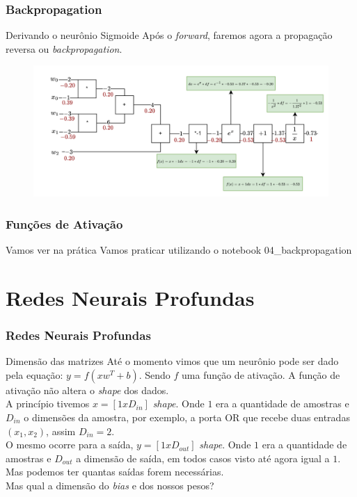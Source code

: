 \documentclass{beamer}
\begin{document}
\begin{frame}
	\frametitle{Backpropagation}
	\begin{block}{Derivando o neurônio Sigmoide}
		Após o \textit{forward}, faremos agora a propagação reversa ou \textit{backpropagation}.
		\begin{figure}
			\centering
			\includegraphics[width=1\linewidth]{figures/sigmoid_example_backprop}
		\end{figure}
	\end{block}
\end{frame}
\begin{frame}
	\frametitle{Funções de Ativação}
	\begin{block}{Vamos ver na prática}
		Vamos praticar utilizando o notebook 04\_backpropagation
	\end{block}
\end{frame}




\section{Redes Neurais Profundas}

\begin{frame}
	\frametitle{Redes Neurais Profundas}
	\begin{block}{Dimensão das matrizes}
		Até o momento vimos que um neurônio pode ser dado pela equação: $y = f(xw^T + b)$. Sendo $f$ uma função de ativação. A função de ativação não altera o \textit{shape} dos dados. \\
		A princípio tivemos $x = [1x D_{in}]$ \textit{shape}. Onde $1$ era a quantidade de amostras e $D_{in}$ o dimensões da amostra, por exemplo, a porta OR que recebe duas entradas $(x_1, x_2)$, assim $D_{in} = 2$. \\
		O mesmo ocorre para a saída, $y = [1x D_{out}]$ \textit{shape}. Onde $1$ era a quantidade de amostras e $D_{out}$ a dimensão de saída, em todos casos visto até agora igual a $1$. Mas podemos ter quantas saídas forem necessárias. \\
		Mas qual a dimensão do \textit{bias} e dos nossos pesos?
				
	\end{block}
\end{frame}
\end{document}
